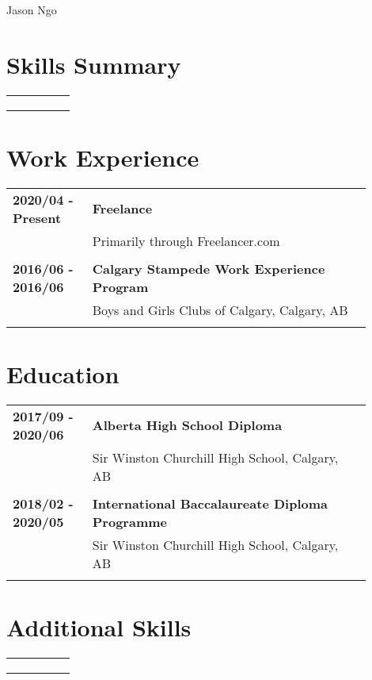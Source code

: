 \documentclass[letterpaper]{article}
\begin{document}
    \begin{center}
        \Large
        Jason Ngo

        \normalsize
        \noindent{\rule{\linewidth}{0.4pt}}
    \end{center}

    \section*{Skills Summary}
        \begin{tabular}{p{0.2\linewidth}p{0.7\linewidth}} 
            \textbf{} & \large\textbf{} \\
            & \\
            \\
        \end{tabular}

    \section*{Work Experience}
        \begin{tabular}{p{0.2\linewidth}p{0.7\linewidth}} 
            \textbf{2020/04 - Present} & \large\textbf{Freelance} \\
            & Primarily through Freelancer.com \\
            \\
            \textbf{2016/06 - 2016/06} & \large\textbf{Calgary Stampede Work Experience Program} \\
            & Boys and Girls Clubs of Calgary, Calgary, AB \\
            \\
        \end{tabular}

    \section*{Education}
        \begin{tabular}{p{0.2\linewidth}p{0.7\linewidth}} 
            \textbf{2017/09 - 2020/06} & \large\textbf{Alberta High School Diploma} \\
            & Sir Winston Churchill High School, Calgary, AB \\
            \\
            \textbf{2018/02 - 2020/05} & \large\textbf{International Baccalaureate Diploma Programme} \\
            & Sir Winston Churchill High School, Calgary, AB \\
            \\
        \end{tabular}

    \section*{Additional Skills}
        \begin{tabular}{p{0.2\linewidth}p{0.7\linewidth}} 
            \textbf{} & \large\textbf{} \\
            & \\
            \\
        \end{tabular}
\end{document}
